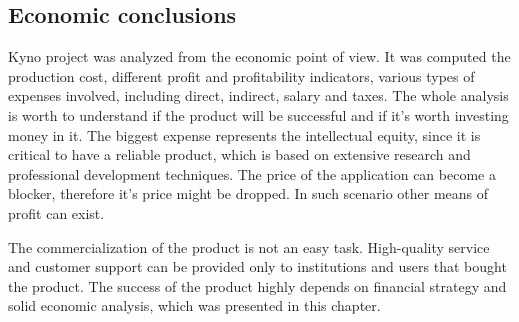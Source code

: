 \subsection{Economic conclusions}
Kyno project was analyzed from the economic point of view. It was computed the production cost, different profit and profitability indicators, various types of expenses involved, including direct, indirect, salary and taxes. The whole analysis is worth to understand if the product will be successful and if it's worth investing money in it. The biggest expense represents the intellectual equity, since it is critical to have a reliable product, which is based on extensive research and professional development techniques. The price of the application can become a blocker, therefore it's price might be dropped. In such scenario other means of profit can exist.

The commercialization of the product is not an easy task. High-quality service and customer support can be provided only to institutions and users that bought the product. The success of the product highly depends on financial strategy and solid economic analysis, which was presented in this chapter.